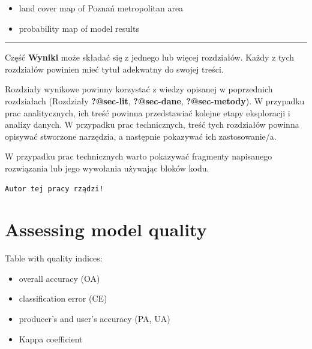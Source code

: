 \documentclass{amuthesis}
\begin{document}
\begin{itemize}
\item
  land cover map of Poznań metropolitan area
\item
  probability map of model results
\end{itemize}

\begin{center}\rule{0.5\linewidth}{0.5pt}\end{center}

Część \textbf{Wyniki} może składać się z jednego lub więcej rozdziałów.
Każdy z tych rozdziałów powinien mieć tytuł adekwatny do swojej treści.

Rozdziały wynikowe powinny korzystać z wiedzy opisanej w poprzednich
rozdziałach (Rozdziały \textbf{?@sec-lit}, \textbf{?@sec-dane},
\textbf{?@sec-metody}). W przypadku prac analitycznych, ich treść
powinna przedstawiać kolejne etapy eksploracji i analizy danych. W
przypadku prac technicznych, treść tych rozdziałów powinna opisywać
stworzone narzędzia, a następnie pokazywać ich zastosowanie/a.

W przypadku prac technicznych warto pokazywać fragmenty napisanego
rozwiązania lub jego wywołania używając bloków kodu.

\begin{Shaded}
\begin{Highlighting}[]
\OtherTok{=} 
  \NormalTok{)}
\NormalTok{\}}
\NormalTok{(}\NormalTok{)}
\end{Highlighting}
\end{Shaded}

\begin{verbatim}
Autor tej pracy rządzi!
\end{verbatim}


\hypertarget{sec-results-eval}{%
\chapter{Assessing model quality}\label{sec-results-eval}}

Table with quality indices:

\begin{itemize}
\item
  overall accuracy (OA)
\item
  classification error (CE)
\item
  producer's and user's accuracy (PA, UA)
\item
  Kappa coefficient
\end{itemize}
\end{document}
